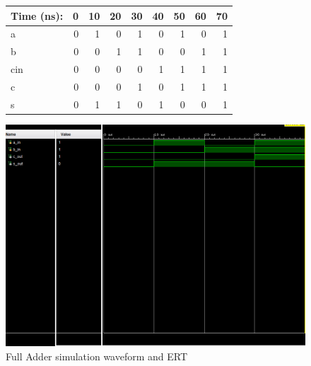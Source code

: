 \documentclass[11pt]{article}
\begin{document}
\begin{figure}[ht]\centering
	\begin{tabular}{l|rrrrrrrr}
		Time (ns): & 0 & 10 & 20 & 30 & 40 & 50 & 60 & 70 \\
		\midrule 
		a &  0 & 1 & 0 & 1 & 0 & 1 & 0 & 1 \\
		b & 0 & 0 & 1 & 1 & 0 & 0 & 1 & 1\\
		cin & 0 & 0 & 0 & 0 & 1 & 1 & 1 & 1 \\
		\midrule
		c & 0 & 0 & 0 & 1 & 0 & 1 & 1 & 1 \\
		s & 0 & 1 & 1 & 0 & 1 & 0 & 0 & 1 \\ \bottomrule
	\end{tabular}\medskip
	
	\includegraphics[width=1.0\textwidth]{FullAdder}
	\caption{Full Adder simulation waveform and ERT}
	\label{fig:sim_with_table}
\end{figure}

\clearpage
\end{document}
